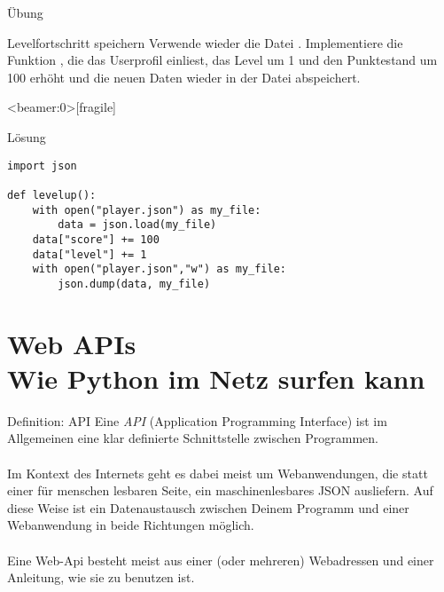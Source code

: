 \begin{frame}{Übung}
\begin{block}{Levelfortschritt speichern}
\vspace{2pt}
Verwende wieder die Datei . Implementiere die Funktion , die das Userprofil einliest, das Level um 1 und den Punktestand um 100 erhöht und die neuen Daten wieder in der Datei  abspeichert. 
\end{block}
\end{frame}


\begin{frame}<beamer:0>[fragile]{}
\begin{solutionblock}{Lösung}

\begin{verbatim}
import json 

def levelup(): 
    with open("player.json") as my_file:
        data = json.load(my_file)
    data["score"] += 100
    data["level"] += 1
    with open("player.json","w") as my_file: 
        json.dump(data, my_file)
\end{verbatim}
\end{solutionblock}
\end{frame}

\section{Web APIs\\ \footnotesize Wie Python im Netz surfen kann}


\begin{frame}

\begin{block}{Definition: API}
\vspace{2pt}
Eine \emph{API} (Application Programming Interface) ist im Allgemeinen eine klar definierte Schnittstelle zwischen Programmen. \\ \\
Im Kontext des Internets geht es dabei meist um Webanwendungen, die statt einer für menschen lesbaren Seite, ein maschinenlesbares JSON ausliefern. Auf diese Weise ist ein Datenaustausch zwischen Deinem Programm und einer Webanwendung in beide Richtungen möglich. \\ \\
Eine Web-Api besteht meist aus einer (oder mehreren) Webadressen und einer Anleitung, wie sie zu benutzen ist. 
\end{block}
\end{frame}


